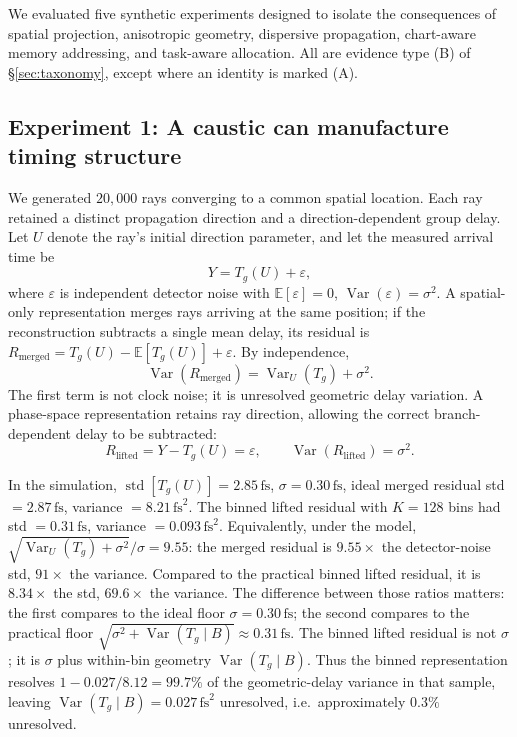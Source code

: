 \documentclass[11pt]{article}
\begin{document}
We evaluated five synthetic experiments designed to isolate the consequences of spatial
projection, anisotropic geometry, dispersive propagation, chart-aware memory addressing,
and task-aware allocation. All are evidence type (B) of \S\ref{sec:taxonomy}, except
where an identity is marked (A).

\subsection{Experiment 1: A caustic can manufacture timing structure}

We generated $20{,}000$ rays converging to a common spatial location. Each ray retained
a distinct propagation direction and a direction-dependent group delay. Let $U$ denote
the ray's initial direction parameter, and let the measured arrival time be
\begin{equation}
Y = T_g(U) + \varepsilon,
\end{equation}
where $\varepsilon$ is independent detector noise with $\mathbb{E}[\varepsilon]=0$,
$\operatorname{Var}(\varepsilon)=\sigma^2$. A spatial-only representation merges rays
arriving at the same position; if the reconstruction subtracts a single mean delay, its
residual is
$R_{\mathrm{merged}} = T_g(U) - \mathbb{E}[T_g(U)] + \varepsilon$. By independence,
\begin{equation}
\boxed{\operatorname{Var}(R_{\mathrm{merged}}) = \operatorname{Var}_U(T_g) + \sigma^2.}
\end{equation}
The first term is not clock noise; it is unresolved geometric delay variation. A
phase-space representation retains ray direction, allowing the correct branch-dependent
delay to be subtracted:
\begin{equation}
R_{\mathrm{lifted}} = Y - T_g(U) = \varepsilon,
\qquad \boxed{\operatorname{Var}(R_{\mathrm{lifted}}) = \sigma^2.}
\end{equation}

In the simulation, $\operatorname{std}[T_g(U)] = 2.85\,\mathrm{fs}$,
$\sigma = 0.30\,\mathrm{fs}$, ideal merged residual std $= 2.87\,\mathrm{fs}$, variance
$= 8.21\,\mathrm{fs}^2$. The binned lifted residual with $K=128$ bins had std
$= 0.31\,\mathrm{fs}$, variance $= 0.093\,\mathrm{fs}^2$. Equivalently, under the model,
$\sqrt{\operatorname{Var}_U(T_g) + \sigma^2}/\sigma = 9.55$: the merged residual is
$9.55\times$ the detector-noise std, $91\times$ the variance. Compared to the practical
binned lifted residual, it is $8.34\times$ the std, $69.6\times$ the variance. The
difference between those ratios matters: the first compares to the ideal floor
$\sigma = 0.30\,\mathrm{fs}$; the second compares to the practical floor
$\sqrt{\sigma^2 + \operatorname{Var}(T_g \mid B)} \approx 0.31\,\mathrm{fs}$. The binned
lifted residual is not $\sigma$; it is $\sigma$ plus within-bin geometry
$\operatorname{Var}(T_g \mid B)$. Thus the binned representation resolves
$1 - 0.027/8.12 = 99.7\%$ of the geometric-delay variance in that sample, leaving
$\operatorname{Var}(T_g \mid B) = 0.027\,\mathrm{fs}^2$ unresolved, i.e.\ approximately
$0.3\%$
unresolved.
\end{document}
